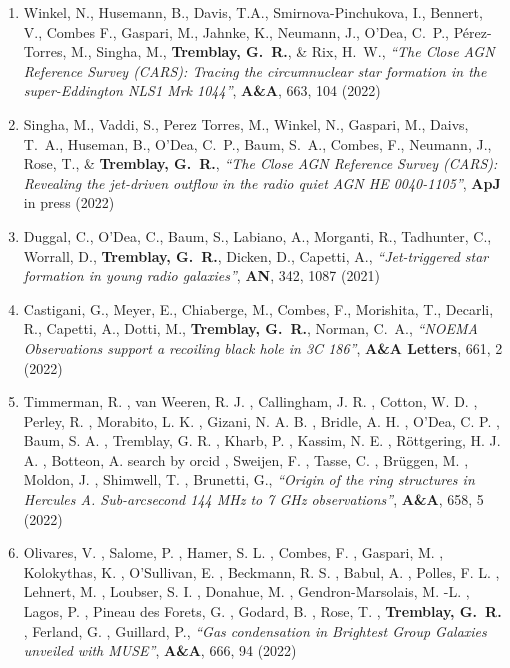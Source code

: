 \documentclass[11pt]{article}
\begin{document}
\begin{enumerate}[resume]
\item Winkel, N., Husemann, B., Davis, T.A., Smirnova-Pinchukova, I., Bennert, V., Combes F., Gaspari, M., Jahnke, K., Neumann, J., O'Dea, C.~P., P\'{e}rez-Torres, M., Singha, M., \textbf{Tremblay, G.~R.}, \& Rix, H.~W., \textit{``The Close AGN Reference Survey (CARS): Tracing the circumnuclear star formation in the super-Eddington NLS1 Mrk 1044''}, \textbf{A\&A}, 663, 104  (2022)

\item Singha, M., Vaddi, S., Perez Torres, M., Winkel, N., Gaspari, M., Daivs, T.~A., Huseman, B., O'Dea, C.~P., Baum, S.~A., Combes, F., Neumann, J., Rose, T., \& \textbf{Tremblay, G.~R.}, \textit{``The Close AGN Reference Survey (CARS): Revealing the jet-driven outflow in the radio quiet AGN HE 0040-1105''}, \textbf{ApJ} in press (2022)

\item Duggal, C., O'Dea, C., Baum, S., Labiano, A., Morganti, R., Tadhunter, C., Worrall, D., \textbf{Tremblay, G.~R.}, Dicken, D., Capetti, A., \textit{``Jet-triggered star formation in young radio galaxies''}, \textbf{AN}, 342, 1087 (2021)

\item Castigani, G., Meyer, E., Chiaberge, M., Combes, F., Morishita, T., Decarli, R., Capetti, A., Dotti, M., \textbf{Tremblay, G.~R.}, Norman, C.~A., \textit{``NOEMA Observations support a recoiling black hole in 3C 186''}, \textbf{A\&A Letters}, 661, 2 (2022)

\item Timmerman, R. , van Weeren, R. J. , Callingham, J. R. , Cotton, W. D. , Perley, R. , Morabito, L. K. , Gizani, N. A. B. , Bridle, A. H. , O'Dea, C. P. , Baum, S. A. , Tremblay, G. R. , Kharb, P. , Kassim, N. E. , R\"{o}ttgering, H. J. A. , Botteon, A. search by orcid , Sweijen, F. , Tasse, C. , Br\"{u}ggen, M. , Moldon, J. , Shimwell, T. , Brunetti, G., \textit{``Origin of the ring structures in Hercules A. Sub-arcsecond 144 MHz to 7 GHz observations''}, \textbf{A\&A}, 658, 5 (2022)

\item Olivares, V. , Salome, P. , Hamer, S. L. , Combes, F. , Gaspari, M. , Kolokythas, K. , O'Sullivan, E. , Beckmann, R. S. , Babul, A. , Polles, F. L. , Lehnert, M. , Loubser, S. I. , Donahue, M. , Gendron-Marsolais, M. -L. , Lagos, P. , Pineau des Forets, G. , Godard, B. , Rose, T. , \textbf{Tremblay, G.~R.} , Ferland, G. , Guillard, P., \textit{``Gas condensation in Brightest Group Galaxies unveiled with MUSE''}, \textbf{A\&A}, 666, 94 (2022)


\end{enumerate}
\end{document}
